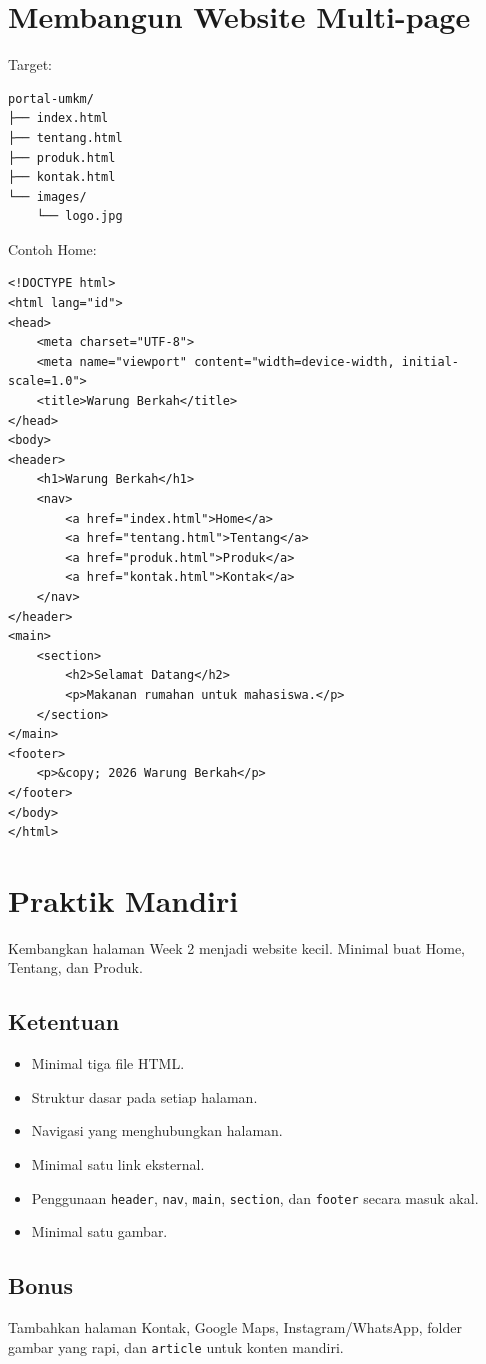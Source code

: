 \documentclass[11pt,a4paper]{article}
\begin{document}
\section{Membangun Website Multi-page}
Target:
\begin{lstlisting}[style=htmlstyle]
portal-umkm/
├── index.html
├── tentang.html
├── produk.html
├── kontak.html
└── images/
    └── logo.jpg
\end{lstlisting}
Contoh Home:
\begin{lstlisting}[style=htmlstyle]
<!DOCTYPE html>
<html lang="id">
<head>
    <meta charset="UTF-8">
    <meta name="viewport" content="width=device-width, initial-scale=1.0">
    <title>Warung Berkah</title>
</head>
<body>
<header>
    <h1>Warung Berkah</h1>
    <nav>
        <a href="index.html">Home</a>
        <a href="tentang.html">Tentang</a>
        <a href="produk.html">Produk</a>
        <a href="kontak.html">Kontak</a>
    </nav>
</header>
<main>
    <section>
        <h2>Selamat Datang</h2>
        <p>Makanan rumahan untuk mahasiswa.</p>
    </section>
</main>
<footer>
    <p>&copy; 2026 Warung Berkah</p>
</footer>
</body>
</html>
\end{lstlisting}

\section{Praktik Mandiri}
Kembangkan halaman Week 2 menjadi website kecil. Minimal buat Home, Tentang, dan Produk.
\subsection{Ketentuan}
\begin{itemize}
\item Minimal tiga file HTML.
\item Struktur dasar pada setiap halaman.
\item Navigasi yang menghubungkan halaman.
\item Minimal satu link eksternal.
\item Penggunaan \texttt{header}, \texttt{nav}, \texttt{main}, \texttt{section}, dan \texttt{footer} secara masuk akal.
\item Minimal satu gambar.
\end{itemize}
\subsection{Bonus}
Tambahkan halaman Kontak, Google Maps, Instagram/WhatsApp, folder gambar yang rapi, dan \texttt{article} untuk konten mandiri.
\end{document}
